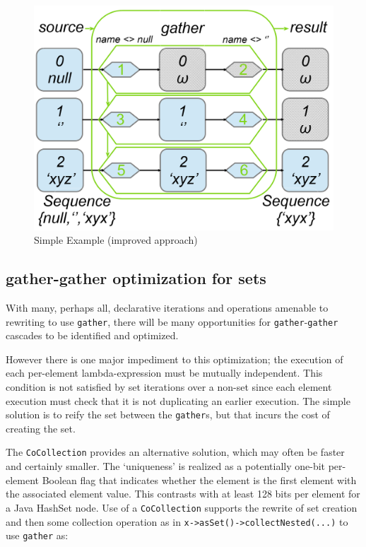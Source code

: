 \documentclass[
]{ceurart}
\begin{document}
\begin{figure}
	\vspace{-10pt}
	\begin{center}
		\includegraphics[width=6.0in]{ExampleImproved.png}
	\end{center}
	\vspace{-10pt}
	\caption{Simple Example (improved approach)}
	\label{fig:ExampleImproved}
	\vspace{-10pt}
\end{figure}

\subsection{gather-gather optimization for sets}

With many, perhaps all, declarative iterations and operations amenable to rewriting to use \verb!gather!, there will be many opportunities for \verb!gather!-\verb!gather! cascades to be identified and optimized.

However there is one major impediment to this optimization; the execution of each per-element lambda-expression must be mutually independent. This condition is not satisfied by set iterations over a non-set since each element execution must check that it is not duplicating an earlier execution. The simple solution is to reify the set between the \verb!gather!s, but that incurs the cost of creating the set.

The \verb!CoCollection! provides an alternative solution, which may often be faster and certainly smaller. The `uniqueness' is realized as a potentially one-bit per-element Boolean flag that indicates whether the element is the first element with the associated element value. This contrasts with at least 128 bits per element for a Java HashSet node. Use of a  \verb!CoCollection! supports the rewrite of set creation and then some collection operation as in \verb!x->asSet()->collectNested(...)! to use \verb!gather! as:
\end{document}

